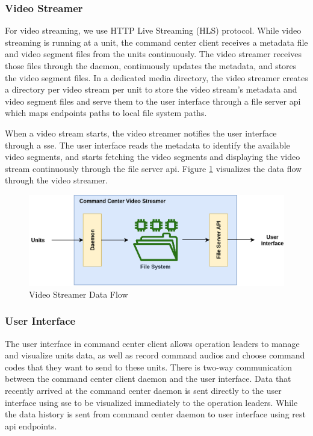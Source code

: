 \subsubsection{Video Streamer}
For video streaming, we use HTTP Live Streaming (HLS) protocol. While video streaming is running at a unit, the command center client receives a metadata file and video segment files from the units continuously. The video streamer receives those files through the daemon, continuously updates the metadata, and stores the video segment files. In a dedicated media directory, the video streamer creates a directory per video stream per unit to store the video stream's metadata and video segment files and serve them to the user interface through a file server \acrshort{api} which maps endpoints paths to local file system paths.

When a video stream starts, the video streamer notifies the user interface through a \acrshort{sse}. The user interface reads the metadata to identify the available video segments, and starts fetching the video segments and displaying the video stream continuously through the file server \acrshort{api}. Figure \ref{fig:video-streamer} visualizes the data flow through the video streamer.

\begin{figure}[!htb]
    \centering
    \includegraphics[width=\linewidth]{images/video-streamer.png}
    \caption{Video Streamer Data Flow}
    \label{fig:video-streamer}
\end{figure}

\subsubsection{User Interface}
The user interface in command center client allows operation leaders to manage and visualize units data, as well as record command audios and choose command codes that they want to send to these units.
There is two-way communication between the command center client daemon and the user interface. Data that recently arrived at the command center daemon is sent directly to the user interface using \acrfull{sse} to be visualized immediately to the operation leaders. While the data history is sent from command center daemon to user interface using \acrfull{rest} \acrshort{api} endpoints. 

